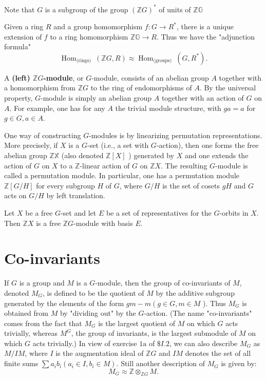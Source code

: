 Note that $G$ is a subgroup of the group $(\mathbb{Z} G)^*$ of units of $\mathbb{Z G}$ 
\begin{theo}
Given a ring $R$ and a group homomorphism $f: G \rightarrow R^*$, there is a unique extension of $f$ to a ring homomorphism $\mathbb{Z G} \rightarrow R$. Thus we have the "adjunction formula"
    $$
    \operatorname{Hom}_{\text {(rings) }}(\mathbb{Z} G, R) \approx \operatorname{Hom}_{\text {(groups) }}\left(G, R^*\right) .
    $$
\end{theo}

A \textbf{(left) $\mathbb{Z} G$-module}, or $G$-module, consists of an abelian group $A$ together with a homomorphism from $\mathbb{Z} G$ to the ring of endomorphisms of $A$. By the universal property, $G$-module is simply an abelian group $A$ together with an action of $G$ on $A$. For example, one has for any $A$ the trivial module structure, with $g a=a$ for $g \in G, a \in A$.

One way of constructing $G$-modules is by linearizing permutation representations. More precisely, if $X$ is a $G$-set (i.e., a set with $G$-action), then one forms the free abelian group $\mathbb{Z X}$ (also denoted $\mathbb{Z}[X]$ ) generated by $X$ and one extends the action of $G$ on $X$ to a $\mathbb{Z}$-linear action of $G$ on $\mathbb{Z} X$. The resulting $G$-module is called a permutation module. In particular, one has a permutation module $\mathbb{Z}[G / H]$ for every subgroup $H$ of $G$, where $G / H$ is the set of cosets $g H$ and $G$ acts on $G / H$ by left translation.

\begin{prop}
Let $X$ be a free $G$-set and let $E$ be a set of representatives for the $G$-orbits in $X$. Then $\mathbb{Z}X$ is a free $\mathbb{Z}G$-module with basis $E$.
\end{prop}


\section{Co-invariants}
If $G$ is a group and $M$ is a $G$-module, then the group of co-invariants of $M$, denoted $M_G$, is defined to be the quotient of $M$ by the additive subgroup generated by the elements of the form $g m-m\left(g \in G, m \in M\right.$ ). Thus $M_G$ is obtained from $M$ by "dividing out" by the $G$-action. (The name "co-invariants" comes from the fact that $M_G$ is the largest quotient of $M$ on which $G$ acts trivially, whereas $M^G$, the group of invariants, is the largest submodule of $M$ on which $G$ acts trivially.) In view of exercise $1 \mathrm{a}$ of $\$ I .2$, we can also describe $M_G$ as $M / I M$, where $I$ is the augmentation ideal of $\mathbb{Z} G$ and $I M$ denotes the set of all finite sums $\sum a_i b_i\left(a_i \in I, b_i \in M\right)$.
Still another description of $M_G$ is given by:
$$
M_G \approx \mathbb{Z} \otimes_{\mathbb{Z} G} M .
$$

